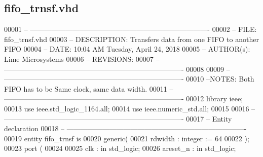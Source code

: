\subsection{fifo\+\_\+trnsf.\+vhd}
\label{fifo__trnsf_8vhd_source}

\begin{DoxyCode}
00001 \textcolor{keyword}{-- ----------------------------------------------------------------------------}
00002 \textcolor{keyword}{-- FILE:          fifo\_trnsf.vhd}
00003 \textcolor{keyword}{-- DESCRIPTION:   Transfers data from one FIFO to another FIFO }
00004 \textcolor{keyword}{-- DATE:          10:04 AM Tuesday, April 24, 2018}
00005 \textcolor{keyword}{-- AUTHOR(s):     Lime Microsystems}
00006 \textcolor{keyword}{-- REVISIONS:}
00007 \textcolor{keyword}{-- ----------------------------------------------------------------------------}
00008 
00009 \textcolor{keyword}{-- ----------------------------------------------------------------------------}
00010 \textcolor{keyword}{--NOTES: Both FIFO has to be Same clock, same data width. }
00011 \textcolor{keyword}{-- ----------------------------------------------------------------------------}
00012 \textcolor{vhdlkeyword}{library }\textcolor{keywordflow}{ieee};
00013 \textcolor{vhdlkeyword}{use }ieee.std\_logic\_1164.\textcolor{keywordflow}{all};
00014 \textcolor{vhdlkeyword}{use }ieee.numeric\_std.\textcolor{keywordflow}{all};
00015 
00016 \textcolor{keyword}{-- ----------------------------------------------------------------------------}
00017 \textcolor{keyword}{-- Entity declaration}
00018 \textcolor{keyword}{-- ----------------------------------------------------------------------------}
00019 \textcolor{keywordflow}{entity }fifo_trnsf \textcolor{keywordflow}{is}
00020    \textcolor{keywordflow}{generic}\textcolor{vhdlchar}{(}
00021       \textcolor{vhdlchar}{rdwidth} \textcolor{vhdlchar}{:} \textcolor{comment}{integer} \textcolor{vhdlchar}{:=} \textcolor{vhdllogic}{}\textcolor{vhdllogic}{64}
00022       \textcolor{vhdlchar}{)};
00023    \textcolor{keywordflow}{port} \textcolor{vhdlchar}{(}
00024 
00025       \textcolor{vhdlchar}{clk}            \textcolor{vhdlchar}{:} \textcolor{keywordflow}{in}  \textcolor{comment}{std\_logic};
00026       \textcolor{vhdlchar}{areset_n}       \textcolor{vhdlchar}{:} \textcolor{keywordflow}{in}  \textcolor{comment}{std\_logic};

\end{DoxyCode}
